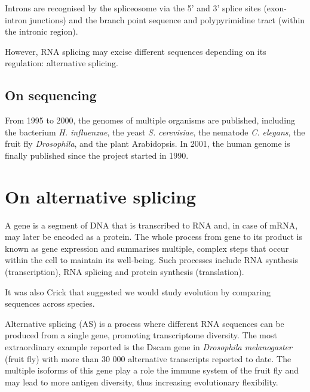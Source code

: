 Introns are recognised by the spliceosome via the 5' and 3' splice sites (exon-intron junctions) and the branch point sequence and polypyrimidine tract (within the intronic region).

However, RNA splicing may excise different sequences depending on its regulation: alternative splicing.

\subsection{On sequencing}



From 1995 to 2000, the genomes of multiple organisms are published, including the bacterium \emph{H. influenzae}, the yeast \emph{S. cerevisiae}, the nematode \emph{C. elegans}, the fruit fly \emph{Drosophila}, and the plant Arabidopsis. In 2001, the human genome is finally published since the project started in 1990.

\section{On alternative splicing}

A gene is a segment of DNA that is transcribed to RNA and, in case of mRNA, may later be encoded as a protein. The whole process from gene to its product is known as gene expression and summarises multiple, complex steps that occur within the cell to maintain its well-being. Such processes include RNA synthesis (transcription), RNA splicing and protein synthesis (translation).

It was also Crick that suggested we would study evolution by comparing sequences across species.



Alternative splicing (AS) is a process where different RNA sequences can be produced from a single gene, promoting transcriptome diversity. The most extraordinary example reported is the Dscam gene in \emph{Drosophila melanogaster} (fruit fly) with more than 30 000 alternative transcripts reported to date. The multiple isoforms of this gene play a role the immune system of the fruit fly and may lead to more antigen diversity, thus increasing evolutionary flexibility.

